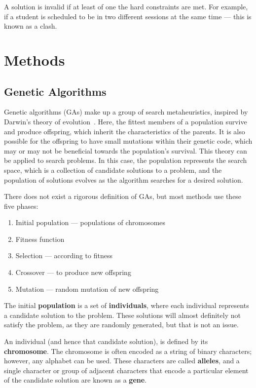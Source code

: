 \documentclass[a4paper, 12pt]{report}
\begin{document}
A solution is invalid if at least of one the hard constraints are met.
For example, if a student is scheduled to be in two different sessions at the
same time --- this is known as a clash.

\section{Methods}

\subsection{Genetic Algorithms}

Genetic algorithms (GAs) make up a group of search metaheuristics, inspired by
Darwin's theory of evolution~\cite{ga_book}.
Here, the fittest members of a population survive and produce offspring, which
inherit the characteristics of the parents.
It is also possible for the offspring to have small mutations within their
genetic code, which may or may not be beneficial towards the population's
survival.
This theory can be applied to search problems.
In this case, the population represents the search space, which is a collection 
of candidate solutions to a problem, and the population of solutions evolves as
the algorithm searches for a desired solution.

There does not exist a rigorous definition of GAs, but most methods use these
five phases:

\begin{enumerate}
	\item Initial population --- populations of chromosomes
	\item Fitness function
	\item Selection --- according to fitness
	\item Crossover --- to produce new offspring
	\item Mutation --- random mutation of new offspring
\end{enumerate}

The initial \textbf{population} is a set of \textbf{individuals}, where each
individual represents a candidate solution to the problem.
These solutions will almost definitely not satisfy the problem, as they are
randomly generated, but that is not an issue.

An individual (and hence that candidate solution), is defined by its
\textbf{chromosome}.
The chromosome is often encoded as a string of binary characters; however, any
alphabet can be used.
These characters are called \textbf{alleles}, and a single character or group of
adjacent characters that encode a particular element of the candidate solution
are known as a \textbf{gene}.
\end{document}
